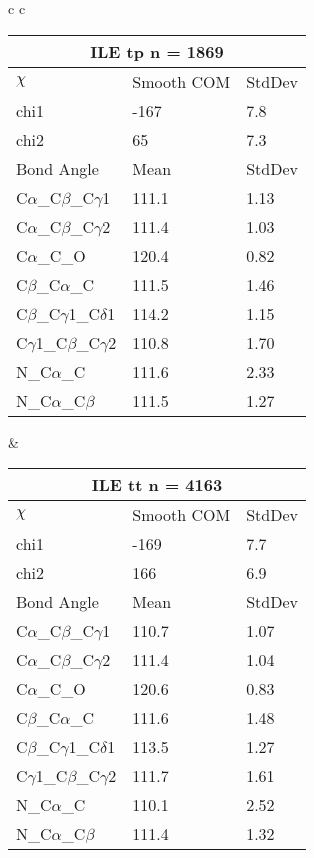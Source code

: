 \begin{longtable}{ c c }
  \\
  \begin{tabular}{ l l l }
  \toprule
  \multicolumn{3}{c}{ILE \textbf{tp} n = 1869} \\ \toprule
  $\chi$       & Smooth COM & StdDev \\ \midrule
  chi1 & -167 & 7.8 \\ 
  chi2 & 65 & 7.3 \\ \midrule
  Bond Angle   & Mean     & StdDev \\ \midrule
  C$\alpha$\_C$\beta$\_C$\gamma$1 & 111.1 & 1.13\\
  C$\alpha$\_C$\beta$\_C$\gamma$2 & 111.4 & 1.03\\
  C$\alpha$\_C\_O & 120.4 & 0.82\\
  C$\beta$\_C$\alpha$\_C & 111.5 & 1.46\\
  C$\beta$\_C$\gamma$1\_C$\delta$1 & 114.2 & 1.15\\
  C$\gamma$1\_C$\beta$\_C$\gamma$2 & 110.8 & 1.70\\
  N\_C$\alpha$\_C & 111.6 & 2.33\\
  N\_C$\alpha$\_C$\beta$ & 111.5 & 1.27\\
  \bottomrule
  \end{tabular}
  &
  \begin{tabular}{ l l l }
  \toprule
  \multicolumn{3}{c}{ILE \textbf{tt} n = 4163} \\ \toprule
  $\chi$       & Smooth COM & StdDev \\ \midrule
  chi1 & -169 & 7.7 \\ 
  chi2 & 166 & 6.9 \\ \midrule
  Bond Angle   & Mean     & StdDev \\ \midrule
  C$\alpha$\_C$\beta$\_C$\gamma$1 & 110.7 & 1.07\\
  C$\alpha$\_C$\beta$\_C$\gamma$2 & 111.4 & 1.04\\
  C$\alpha$\_C\_O & 120.6 & 0.83\\
  C$\beta$\_C$\alpha$\_C & 111.6 & 1.48\\
  C$\beta$\_C$\gamma$1\_C$\delta$1 & 113.5 & 1.27\\
  C$\gamma$1\_C$\beta$\_C$\gamma$2 & 111.7 & 1.61\\
  N\_C$\alpha$\_C & 110.1 & 2.52\\
  N\_C$\alpha$\_C$\beta$ & 111.4 & 1.32\\
  \bottomrule
  \end{tabular}
  \\
  \begin{tabular}{ l l l }

\end{tabular}
\end{longtable}
